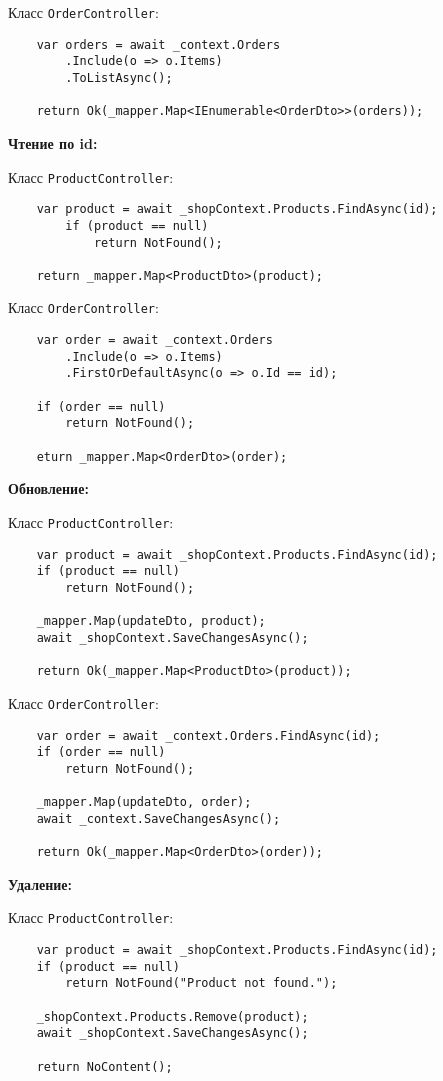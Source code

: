 \documentclass[a4paper,12pt]{report}
\begin{document}
Класс \texttt{OrderController}:
\begin{verbatim}
    var orders = await _context.Orders
        .Include(o => o.Items)
        .ToListAsync();

    return Ok(_mapper.Map<IEnumerable<OrderDto>>(orders));
\end{verbatim}

\textbf{Чтение по id:}

Класс \texttt{ProductController}:
\begin{verbatim}
    var product = await _shopContext.Products.FindAsync(id);
        if (product == null)
            return NotFound();

    return _mapper.Map<ProductDto>(product);
\end{verbatim}

Класс \texttt{OrderController}:
\begin{verbatim}
    var order = await _context.Orders
        .Include(o => o.Items)
        .FirstOrDefaultAsync(o => o.Id == id);

    if (order == null)
        return NotFound();

    eturn _mapper.Map<OrderDto>(order);
\end{verbatim}

\textbf{Обновление:}

Класс \texttt{ProductController}:
\begin{verbatim}
    var product = await _shopContext.Products.FindAsync(id);
    if (product == null)
        return NotFound();

    _mapper.Map(updateDto, product);
    await _shopContext.SaveChangesAsync();

    return Ok(_mapper.Map<ProductDto>(product));
\end{verbatim}

Класс \texttt{OrderController}:
\begin{verbatim}
    var order = await _context.Orders.FindAsync(id);
    if (order == null)
        return NotFound();

    _mapper.Map(updateDto, order);
    await _context.SaveChangesAsync();

    return Ok(_mapper.Map<OrderDto>(order));
\end{verbatim}

\textbf{Удаление:}

Класс \texttt{ProductController}:
\begin{verbatim}
    var product = await _shopContext.Products.FindAsync(id);
    if (product == null)
        return NotFound("Product not found.");

    _shopContext.Products.Remove(product);
    await _shopContext.SaveChangesAsync();

    return NoContent();
\end{verbatim}
\end{document}

